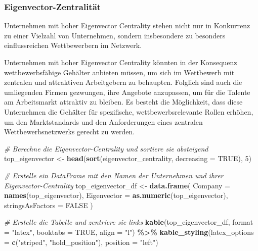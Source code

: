 \documentclass[
]{article}
\newenvironment{Shaded}{\begin{snugshade}}{\end{snugshade}}
\newcommand{\AttributeTok}[1]{\textcolor[rgb]{0.13,0.29,0.53}{#1}}
\newcommand{\CommentTok}[1]{\textcolor[rgb]{0.56,0.35,0.01}{\textit{#1}}}
\newcommand{\ConstantTok}[1]{\textcolor[rgb]{0.56,0.35,0.01}{#1}}
\newcommand{\DecValTok}[1]{\textcolor[rgb]{0.00,0.00,0.81}{#1}}
\newcommand{\FunctionTok}[1]{\textcolor[rgb]{0.13,0.29,0.53}{\textbf{#1}}}
\newcommand{\NormalTok}[1]{#1}
\newcommand{\OtherTok}[1]{\textcolor[rgb]{0.56,0.35,0.01}{#1}}
\newcommand{\SpecialCharTok}[1]{\textcolor[rgb]{0.81,0.36,0.00}{\textbf{#1}}}
\newcommand{\StringTok}[1]{\textcolor[rgb]{0.31,0.60,0.02}{#1}}
\begin{document}
\subsubsection{Eigenvector-Zentralität}\label{eigenvector-zentralituxe4t}

Unternehmen mit hoher Eigenvector Centrality stehen nicht nur in
Konkurrenz zu einer Vielzahl von Unternehmen, sondern insbesondere zu
besonders einflussreichen Wettbewerbern im Netzwerk.

Unternehmen mit hoher Eigenvector Centrality könnten in der Konsequenz
wettbewerbsfähige Gehälter anbieten müssen, um sich im Wettbewerb mit
zentralen und attraktiven Arbeitgebern zu behaupten. Folglich sind auch
die umliegenden Firmen gezwungen, ihre Angebote anzupassen, um für die
Talente am Arbeitsmarkt attraktiv zu bleiben. Es besteht die
Möglichkeit, dass diese Unternehmen die Gehälter für spezifische,
wettbewerbsrelevante Rollen erhöhen, um den Marktstandards und den
Anforderungen eines zentralen Wettbewerbsnetzwerks gerecht zu werden.

\begin{Shaded}
\begin{Highlighting}[]
\CommentTok{\# Berechne die Eigenvector{-}Centrality und sortiere sie absteigend}
\NormalTok{top\_eigenvector }\OtherTok{\textless{}{-}} \FunctionTok{head}\NormalTok{(}\FunctionTok{sort}\NormalTok{(eigenvector\_centrality, }\AttributeTok{decreasing =} \ConstantTok{TRUE}\NormalTok{), }\DecValTok{5}\NormalTok{)}

\CommentTok{\# Erstelle ein DataFrame mit den Namen der Unternehmen und ihrer Eigenvector{-}Centrality}
\NormalTok{top\_eigenvector\_df }\OtherTok{\textless{}{-}} \FunctionTok{data.frame}\NormalTok{(}
  \AttributeTok{Company =} \FunctionTok{names}\NormalTok{(top\_eigenvector),}
  \AttributeTok{Eigenvector =} \FunctionTok{as.numeric}\NormalTok{(top\_eigenvector),}
  \AttributeTok{stringsAsFactors =} \ConstantTok{FALSE}
\NormalTok{)}

\CommentTok{\# Erstelle die Tabelle und zentriere sie links}
\FunctionTok{kable}\NormalTok{(top\_eigenvector\_df, }\AttributeTok{format =} \StringTok{"latex"}\NormalTok{, }\AttributeTok{booktabs =} \ConstantTok{TRUE}\NormalTok{, }\AttributeTok{align =} \StringTok{"l"}\NormalTok{) }\SpecialCharTok{\%\textgreater{}\%}
  \FunctionTok{kable\_styling}\NormalTok{(}\AttributeTok{latex\_options =} \FunctionTok{c}\NormalTok{(}\StringTok{"striped"}\NormalTok{, }\StringTok{"hold\_position"}\NormalTok{), }\AttributeTok{position =} \StringTok{"left"}\NormalTok{)}
\end{Highlighting}
\end{Shaded}
\end{document}
